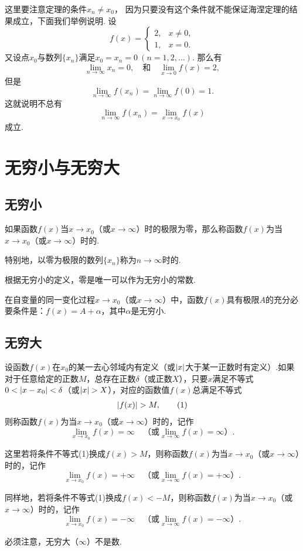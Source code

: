 这里要注意定理的条件\(x_n \neq x_0\)，
因为只要没有这个条件就不能保证海涅定理的结果成立，下面我们举例说明.
设\[
	f(x) = \left\{ \begin{array}{cl}
		2, & x\neq0, \\
		1, & x=0.
	\end{array} \right.
\]
又设点\(x_0\)与数列\(\{x_n\}\)满足\(x_0=x_n=0\ (n=1,2,\dotsc)\).
那么有\[
	\lim_{n\to\infty} x_n = 0,
	\quad\text{和}\quad
	\lim_{x\to0} f(x) = 2,
\]
但是\[
	\lim_{n\to\infty} f(x_n) = \lim_{n\to\infty} f(0) = 1.
\]这就说明不总有\[
	\lim_{n\to\infty} f(x_n)
	= \lim_{x \to x_0} f(x)
\]成立.

\section{无穷小与无穷大}
\subsection{无穷小}
\begin{definition}
如果函数\(f(x)\)当\(x \to x_0\)（或\(x \to \infty\)）时的极限为零，那么称函数\(f(x)\)为当\(x \to x_0\)（或\(x \to \infty\)）时的.

特别地，以零为极限的数列\(\{x_n\}\)称为\(n \to \infty\)时的.
\end{definition}

根据无穷小的定义，零是唯一可以作为无穷小的常数.

\begin{theorem}
在自变量的同一变化过程\(x \to x_0\)（或\(x \to \infty\)）中，函数\(f(x)\)具有极限\(A\)的充分必要条件是：\(f(x) = A + \alpha\)，其中\(\alpha\)是无穷小.
\end{theorem}

\subsection{无穷大}
\begin{definition}
设函数\(f(x)\)在\(x_0\)的某一去心邻域内有定义（或\(\abs{x}\)大于某一正数时有定义）.如果对于任意给定的正数\(M\)，总存在正数\(\delta\)（或正数\(X\)），只要\(x\)满足不等式\(0 < \abs{x - x_0} < \delta\)（或\(\abs{x} > X\)），对应的函数值\(f(x)\)总满足不等式\begin{gather}
\abs{f(x)} > M, \tag1
\end{gather}则称函数\(f(x)\)为当\(x \to x_0\)（或\(x \to \infty\)）时的，记作\[
\lim_{x \to x_0}f(x) = \infty
\quad\text{（或} \lim_{x \to \infty}f(x) = \infty \text{）}.
\]

这里若将条件不等式(1)换成\(f(x) > M\)，则称函数\(f(x)\)为当\(x \to x_0\)（或\(x \to \infty\)）时的，记作\[
\lim_{x \to x_0}f(x) = +\infty
\quad\text{（或} \lim_{x \to \infty}f(x) = +\infty \text{）}.
\]

同样地，若将条件不等式(1)换成\(f(x) < -M\)，则称函数\(f(x)\)为当\(x \to x_0\)（或\(x \to \infty\)）时的，记作\[
\lim_{x \to x_0}f(x) = -\infty
\quad\text{（或} \lim_{x \to \infty}f(x) = -\infty \text{）}.
\]
\end{definition}
必须注意，无穷大（\(\infty\)）不是数.


